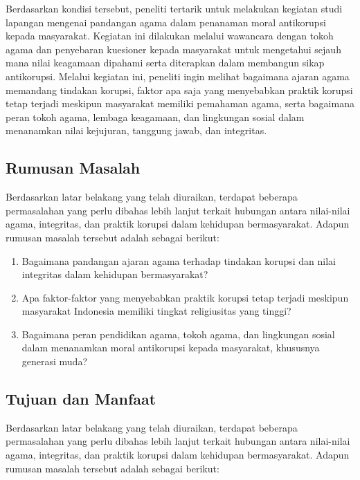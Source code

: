     Berdasarkan kondisi tersebut, peneliti tertarik untuk melakukan kegiatan studi lapangan mengenai pandangan agama dalam penanaman moral antikorupsi kepada masyarakat. Kegiatan ini dilakukan melalui wawancara dengan tokoh agama dan penyebaran kuesioner kepada masyarakat untuk mengetahui sejauh mana nilai keagamaan dipahami serta diterapkan dalam membangun sikap antikorupsi. Melalui kegiatan ini, peneliti ingin melihat bagaimana ajaran agama memandang tindakan korupsi, faktor apa saja yang menyebabkan praktik korupsi tetap terjadi meskipun masyarakat memiliki pemahaman agama, serta bagaimana peran tokoh agama, lembaga keagamaan, dan lingkungan sosial dalam menanamkan nilai kejujuran, tanggung jawab, dan integritas.

\subsection{Rumusan Masalah}
\begin{sloppypar}
    Berdasarkan latar belakang yang telah diuraikan, terdapat beberapa permasalahan yang perlu dibahas lebih lanjut terkait hubungan antara nilai-nilai agama, integritas, dan praktik korupsi dalam kehidupan bermasyarakat. Adapun rumusan masalah tersebut adalah sebagai berikut:
\end{sloppypar}
\begin{enumerate}
    \item Bagaimana pandangan ajaran agama terhadap tindakan korupsi dan nilai integritas dalam kehidupan bermasyarakat?
    \item Apa faktor-faktor yang menyebabkan praktik korupsi tetap terjadi meskipun masyarakat Indonesia memiliki tingkat religiusitas yang tinggi?
    \item Bagaimana peran pendidikan agama, tokoh agama, dan lingkungan sosial dalam menanamkan moral antikorupsi kepada masyarakat, khususnya generasi muda?
\end{enumerate}

\subsection{Tujuan dan Manfaat}
\begin{sloppypar}
    Berdasarkan latar belakang yang telah diuraikan, terdapat beberapa permasalahan yang perlu dibahas lebih lanjut terkait hubungan antara nilai-nilai agama, integritas, dan praktik korupsi dalam kehidupan bermasyarakat. Adapun rumusan masalah tersebut adalah sebagai berikut:
\end{sloppypar}
